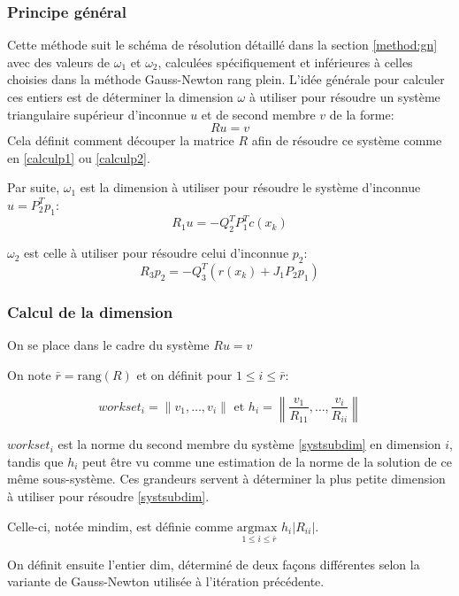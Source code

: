 \documentclass[a4paper,11pt]{article}
\numberwithin{equation}{section}
\begin{document}
\subsubsection{Principe général}


Cette méthode suit le schéma de résolution détaillé dans la section \ref{method:gn} avec des valeurs de $\omega_{1}$ et $\omega_{2}$, calculées spécifiquement et inférieures à celles choisies dans la méthode Gauss-Newton rang plein. L'idée générale pour calculer ces entiers est de déterminer la dimension $\omega$ à utiliser pour résoudre un système triangulaire supérieur d'inconnue $u$ et de second membre $v$ de la forme: 
\begin{equation} \label{systsubdim}
Ru=v
\end{equation}
Cela définit comment découper la matrice $R$ afin de résoudre ce système comme en \ref{calculp1} ou \ref{calculp2}.

Par suite, $\omega_{1}$ est la dimension à utiliser pour résoudre le système d'inconnue $u=P_{2}^{T}p_1$: $$R_{1}u = -Q_2^TP_1^Tc(x_{k})$$

 $\omega_{2}$ est celle à utiliser pour résoudre celui d'inconnue $p_{2}$: $$R_{3}p_2 = -Q_3^T(r(x_{k}) + J_1P_{2}p_1)$$ 
 
 \subsubsection{Calcul de la dimension}
 
 On se place dans le cadre du système $Ru=v$
 
 On note $\bar{r}=\text{rang}(R)$ et on définit pour $1\leq i \leq \bar{r}$:
\newcommand{\ws}{workset}
 
 $$\ws_{i} = \|v_{1},\ldots, v_{i}\| \text{ et } h_{i}=\left \|\frac{v_{1}}{R_{11}},\ldots,\frac{v_{i}}{R_{ii}} \right \|$$
 
 $\ws_{i}$ est la norme du second membre du système \ref{systsubdim} en dimension $i$, tandis que $h_{i}$ peut être vu comme une estimation de la norme de la solution de ce même sous-système. Ces grandeurs servent à déterminer la plus petite dimension à utiliser pour résoudre \ref{systsubdim}.
 
 Celle-ci, notée $\text{mindim}$, est définie comme $\underset{1\leq i \leq \bar{r}}{\text{argmax }} h_{i}|R_{ii}|$.
 
On définit ensuite l'entier dim, déterminé de deux fa\c cons différentes selon la variante de Gauss-Newton utilisée à l'itération précédente.
\end{document}
